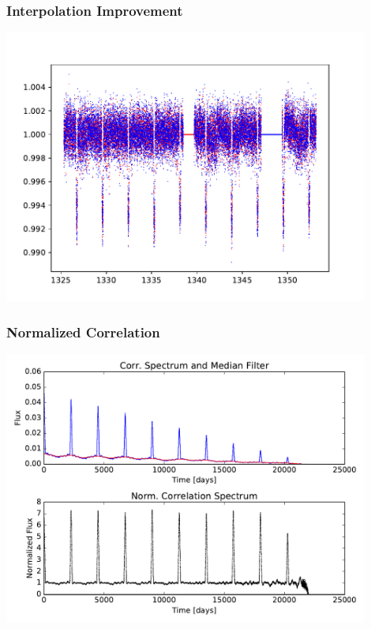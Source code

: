 \documentclass[notes]{beamer}
\begin{document}
\begin{frame}
\frametitle{Interpolation Improvement}
\centering
\includegraphics[width=0.9\textwidth]{../figures/2019-1-15_11:5:15_intercurve_TIC38846515.pdf}
\end{frame}

\begin{frame}
\frametitle{Normalized Correlation}
\centering
\includegraphics[width=0.9\textwidth]{../figures/2019-1-15_16:2:14_normcurve_correlation_TIC38846515.pdf}
\end{frame}
\end{document}
